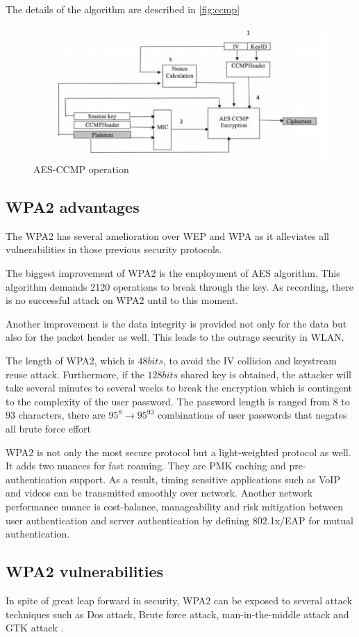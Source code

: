 The details of the algorithm are described in \autoref{fig:ccmp}%

\begin{figure}
	\includegraphics[scale=0.3]{images/ccmp.png}
	\caption{AES-CCMP operation}
	\label{fig:ccmp}
\end{figure}

\subsection{WPA2 advantages}
The \ac{WPA}2 has several amelioration over \ac{WEP} and \ac{WPA} as it alleviates all vulnerabilities in those previous security protocols. 

The biggest improvement of \ac{WPA}2 is the employment of \ac{AES} algorithm. This algorithm demands 2120 operations to break through the key. As recording, there is no successful attack on \ac{WPA}2 until to this moment.%

Another improvement is the data integrity is provided not only for the data but also for the packet header as well. This leads to the outrage security in \ac{WLAN}.

The length of \ac{WPA}2, which is $48bits$, to avoid the \ac{IV} collision and keystream reuse attack. Furthermore, if the $128 bits$ shared key is obtained, the attacker will take several minutes to several weeks to break the encryption which is contingent to the complexity of the user password. The password length is ranged from $8$ to $93$ characters, there are $95^8 \rightarrow 95^{93}$ combinations of user passwords that negates all brute force effort %

\ac{WPA}2 is not only the most secure protocol but a light-weighted protocol as well. It adds two nuances for fast roaming. They are PMK caching and pre-authentication support. As a result, timing sensitive applications such as VoIP and videos can be transmitted smoothly over network. Another network performance nuance is cost-balance, manageability and risk mitigation between user authentication and server authentication by defining 802.1x/\ac{EAP} for mutual authentication.

\subsection{WPA2 vulnerabilities}

In spite of great leap forward in security, \ac{WPA}2 can be exposed to several attack techniques such as \ac{Dos} attack, Brute force attack, man-in-the-middle attack and \ac{GTK} attack \cite{alblwi2017survey}.



